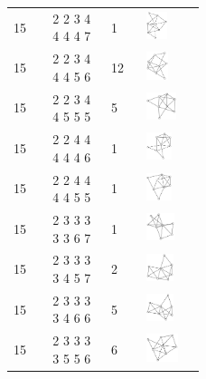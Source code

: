 \begin{footnotesize}
\begin{longtable}{m{0.07\linewidth} m{0.15\linewidth} m{0.05\linewidth} m{0.15\linewidth}}
15 & 2 2 3 4 4 4 4 7 & 1 & \includegraphics[height=0.8cm]{15-universal-graphs/img/degree-sequences-example-graphs/graph-4-8-115}\\
15 & 2 2 3 4 4 4 5 6 & 12 & \includegraphics[height=0.8cm]{15-universal-graphs/img/degree-sequences-example-graphs/graph-4-8-116}\\
15 & 2 2 3 4 4 5 5 5 & 5 & \includegraphics[height=0.8cm]{15-universal-graphs/img/degree-sequences-example-graphs/graph-4-8-117}\\
15 & 2 2 4 4 4 4 4 6 & 1 & \includegraphics[height=0.8cm]{15-universal-graphs/img/degree-sequences-example-graphs/graph-4-8-118}\\
15 & 2 2 4 4 4 4 5 5 & 1 & \includegraphics[height=0.8cm]{15-universal-graphs/img/degree-sequences-example-graphs/graph-4-8-119}\\
15 & 2 3 3 3 3 3 6 7 & 1 & \includegraphics[height=0.8cm]{15-universal-graphs/img/degree-sequences-example-graphs/graph-4-8-120}\\
15 & 2 3 3 3 3 4 5 7 & 2 & \includegraphics[height=0.8cm]{15-universal-graphs/img/degree-sequences-example-graphs/graph-4-8-121}\\
15 & 2 3 3 3 3 4 6 6 & 5 & \includegraphics[height=0.8cm]{15-universal-graphs/img/degree-sequences-example-graphs/graph-4-8-122}\\
15 & 2 3 3 3 3 5 5 6 & 6 & \includegraphics[height=0.8cm]{15-universal-graphs/img/degree-sequences-example-graphs/graph-4-8-123}\\

\end{longtable}
\end{footnotesize}
